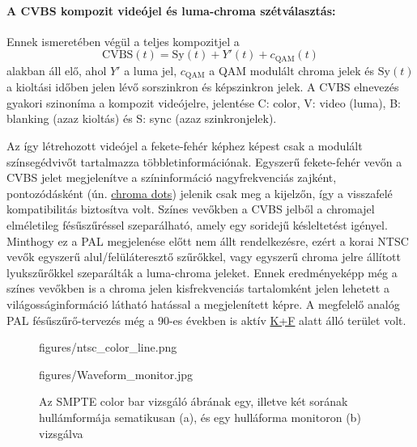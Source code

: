 \paragraph{A CVBS kompozit videójel és luma-chroma szétválasztás:}
Ennek ismeretében végül a teljes kompozitjel a 
\begin{equation}
\text{CVBS}(t) = \mathrm{Sy}(t) + Y'(t) + c_{\mathrm{QAM}}(t)
\end{equation}
alakban áll elő, ahol $Y'$ a luma jel, $c_{\mathrm{QAM}}$ a QAM modulált chroma jelek és $\mathrm{S\!y}(t)$ a kioltási időben jelen lévő sorszinkron és képszinkron jelek.
A CVBS elnevezés gyakori szinoníma a kompozit videójelre, jelentése C: color, V: video (luma), B: blanking (azaz kioltás) és S: sync (azaz szinkronjelek).

Az így létrehozott videójel a fekete-fehér képhez képest csak a modulált színsegédvivőt tartalmazza többletinformációnak.
Egyszerű fekete-fehér vevőn a CVBS jelet megjelenítve a színinformáció nagyfrekvenciás zajként, pontozódásként (ún. \href{http://www.techmind.org/colrec/}{chroma dots}) jelenik csak meg a kijelzőn, így a visszafelé kompatibilitás biztosítva volt.
Színes vevőkben a CVBS jelből a chromajel elméletileg fésűszűréssel szeparálható, amely egy soridejű késleltetést igényel.
Minthogy ez a PAL megjelenése előtt nem állt rendelkezésre, ezért a korai NTSC vevők egyszerű alul/felüláteresztő szűrőkkel, vagy egyszerű chroma jelre állított lyukszűrőkkel szeparálták a luma-chroma jeleket.
Ennek eredményeképp még a színes vevőkben is a chroma jelen kisfrekvenciás tartalomként jelen lehetett a világosságinformáció látható hatással a megjelenített képre.
A megfelelő analóg PAL fésűszűrő-tervezés még a 90-es években is aktív \href{https://www.renesas.com/in/en/www/doc/application-note/an9644.pdf}{K+F} alatt álló terület volt.

\begin{figure}[]
	\centering
	\begin{overpic}[width = 0.45\columnwidth ]{figures/ntsc_color_line.png}
	\end{overpic} \hfill
	\begin{overpic}[width = 0.48\columnwidth ]{figures/Waveform_monitor.jpg}
	\end{overpic} \hfill
	\caption{Az SMPTE color bar vizsgáló ábrának egy, illetve két sorának hullámformája sematikusan (a), és egy hulláforma monitoron (b) vizsgálva}
	\label{Fig:NTSC_line}
\end{figure}

